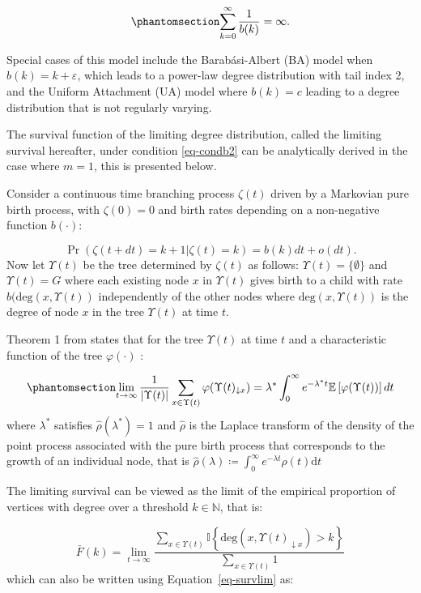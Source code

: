 \documentclass[
  sn-basic,
]{sn-jnl}
\theoremstyle{plain}
\theoremstyle{plain}
\theoremstyle{remark}
\begin{document}
\begin{equation}\phantomsection\label{eq-condb2}{
\sum_{k=0}^\infty\frac{1}{b(k)} = \infty.
}\end{equation}

Special cases of this model include the Barabási-Albert (BA) model when
\(b(k) = k+\varepsilon\), which leads to a power-law degree distribution
with tail index 2, and the Uniform Attachment (UA) model where
\(b(k)=c\) leading to a degree distribution that is not regularly
varying.

The survival function of the limiting degree distribution, called the
limiting survival hereafter, under condition \ref{eq-condb2} can be
analytically derived in the case where \(m=1\), this is presented below.

Consider a continuous time branching process \(\zeta(t)\) driven by a
Markovian pure birth process, with \(\zeta(0)=0\) and birth rates
depending on a non-negative function \(b(\cdot)\):

\[
\Pr(\zeta(t+dt)=k+1|\zeta(t)=k) = b(k)dt + o(dt).
\] Now let \(\Upsilon(t)\) be the tree determined by \(\zeta(t)\) as
follows: \(\Upsilon(t)=\{\emptyset\}\) and \(\Upsilon(t)=G\) where each
existing node \(x\) in \(\Upsilon(t)\) gives birth to a child with rate
\(b(\mathrm{deg}(x, \Upsilon(t))\) independently of the other nodes
where \(\mathrm{deg}(x, \Upsilon(t))\) is the degree of node \(x\) in
the tree \(\Upsilon(t)\) at time \(t\).

Theorem 1 from \citet{rudas07} states that for the tree \(\Upsilon(t)\)
at time \(t\) and a characteristic function of the tree
\(\varphi(\cdot)\) :

\begin{equation}\phantomsection\label{eq-survlim}{
\lim_{t\rightarrow\infty}\frac{1}{|\Upsilon(t)|}\sum_{x\in\Upsilon(t)}\varphi(\Upsilon(t)_{\downarrow x}) = \lambda^* \int_0^\infty e^{-\lambda^* t}\mathbb E\left[\varphi(\Upsilon(t))\right]dt
}\end{equation} where \(\lambda^*\) satisfies \(\hat\rho(\lambda^*)=1\)
and \(\hat\rho\) is the Laplace transform of the density of the point
process associated with the pure birth process that corresponds to the
growth of an individual node, that is
\(\hat\rho(\lambda) \coloneq \int_0^\infty e^{-\lambda t}\rho(t)\mathrm{d}t\)

The limiting survival can be viewed as the limit of the empirical
proportion of vertices with degree over a threshold \(k\in\mathbb N\),
that is:

\[
\bar F(k) = \lim_{t\rightarrow\infty}\frac{\sum_{x\in\Upsilon(t)}\mathbb I\left\{\text{deg}(x,\Upsilon(t)_{\downarrow x})>k\right\}}{\sum_{x\in\Upsilon(t)} 1}
\] which can also be written using Equation~\ref{eq-survlim} as:
\end{document}
